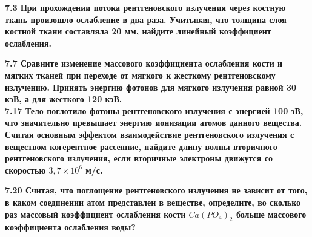 \documentclass[a4paper, fontsize=14pt]{extreport}
\newcounter{Solving}
\begin{document}
\textbf{7.3 При прохождении потока рентгеновского излучения через костную ткань произошло ослабление в два раза. Учитывая, что толщина слоя костной ткани составляла 20 мм, найдите линейный коэффициент ослабления.}
%
%
%
%

\textbf{7.7 Сравните изменение массового коэффициента ослабления кости и мягких тканей при переходе от мягкого к жесткому рентгеновскому излучению. Принять энергию фотонов для мягкого излучения равной 30 кэВ, а для жесткого 120 кэВ.} \\
%
%
%
%

\textbf{7.17 Тело поглотило фотоны рентгеновского излучения с энергией 100 эВ, что значительно превышает энергию ионизации атомов данного вещества. Считая основным эффектом взаимодействие рентгеновского излучения с веществом когерентное рассеяние, найдите длину волны вторичного рентгеновского излучения, если вторичные электроны движутся со скоростью $3,7 \times 10^6$ м/с.}


\textbf{7.20 Считая, что поглощение рентгеновского излучения не зависит от того, в каком соединении атом представлен в веществе, определите, во сколько раз массовый коэффициент ослабления кости $Ca(PO_4)_2$ больше массового коэффициента ослабления воды? }

\end{document}
